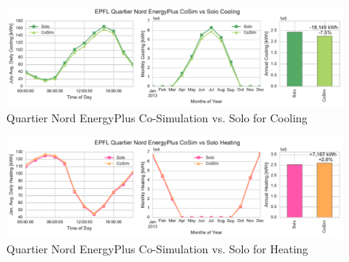 \documentclass{tBPS2e}
\theoremstyle{plain}
\theoremstyle{definition}
\theoremstyle{remark}
\newcommand{\noteCM}[1]{\footnote{\textcolor{red}{#1}}}
\begin{document}
\begin{figure}[H]
\centering
\includegraphics[scale=0.55]{figures/QN_EnergyPlus_Cooling}
\caption{Quartier Nord EnergyPlus Co-Simulation vs. Solo for Cooling}
\label{fig:qn_eplus_cosimvssolo_cooling}
\end{figure}


\begin{figure}[H]
\centering
\includegraphics[scale=0.55]{figures/QN_EnergyPlus_Heating}
\caption{Quartier Nord EnergyPlus Co-Simulation vs. Solo for Heating}
\label{fig:qn_eplus_cosimvssolo_heating}
\end{figure}



\end{document}
